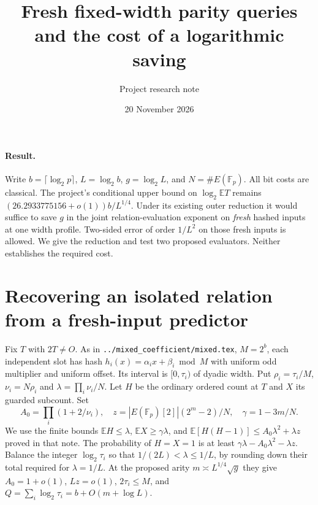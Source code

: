 \documentclass[11pt]{article}
\title{Fresh fixed-width parity queries and the cost of a logarithmic saving}
\author{Project research note}
\date{20 November 2026}
\newcommand{\E}{\mathbb E}
\begin{document}
\maketitle

\paragraph{Result.}
Write $b=\lceil\log_2p\rceil$, $L=\log_2 b$, $g=\log_2 L$, and
$N=\#E(\mathbb F_p)$. All bit costs are classical. The project's
conditional upper bound on $\log_2\E T$ remains
$(26.2933775156+o(1))b/L^{1/4}$. Under its existing outer reduction
it would suffice to save $g$ in the joint relation-evaluation exponent
on \emph{fresh} hashed inputs at one width profile. Two-sided error of
order $1/L^2$ on those fresh inputs is allowed. We give the reduction
and test two proposed evaluators. Neither establishes the required cost.

\section{Recovering an isolated relation from a fresh-input predictor}
Fix $T$ with $2T\ne O$. As in \texttt{../mixed\_coefficient/mixed.tex},
$M=2^b$, each independent slot has hash $h_i(x)=\alpha_ix+\beta_i\bmod M$
with uniform odd multiplier and uniform offset. Its interval is
$[0,\tau_i)$ of dyadic width. Put $\rho_i=\tau_i/M$, $\nu_i=N\rho_i$
and $\lambda=\prod_i\nu_i/N$. Let $H$ be the ordinary ordered count
at $T$ and $X$ its guarded subcount. Set
\[
 A_0=\prod_i(1+2/\nu_i),\quad z=|E(\mathbb F_p)[2]|(2^m-2)/N,\quad
 \gamma=1-3m/N .
\]
We use the finite bounds $\E H\le\lambda$, $\E X\ge\gamma\lambda$,
and $\E[H(H-1)]\le A_0\lambda^2+\lambda z$ proved in that note.
The probability of $H=X=1$ is at least $\gamma\lambda-A_0\lambda^2-\lambda z$.
Balance the integer $\log_2\tau_i$ so that $1/(2L)<\lambda\le1/L$,
by rounding down their total required for $\lambda=1/L$. At the
proposed arity $m\asymp L^{1/4}\sqrt g$ they give $A_0=1+o(1)$,
$Lz=o(1)$, $2\tau_i\le M$, and $Q=\sum_i\log_2\tau_i=b+O(m+\log L)$.
\end{document}
